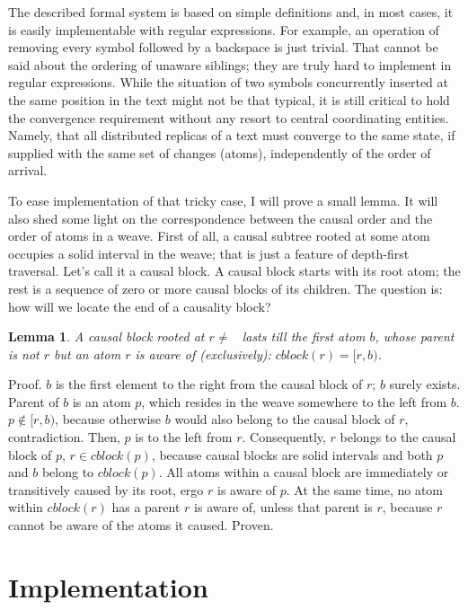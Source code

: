 \documentclass{acm_proc_article-sp}
\newtheorem{lemma}{Lemma}
\begin{document}
The described formal system is based on simple definitions
and, in most cases, it is easily implementable with regular
expressions. For example, an operation of removing every
symbol followed by a backspace is just trivial. That cannot
be said about the ordering of unaware siblings; they are
truly hard to implement in regular expressions. While the
situation of two symbols concurrently inserted at the same position
in the text might not be that typical, it is still critical
to hold the convergence requirement without any resort to
central coordinating entities. Namely, that all distributed
replicas of a text must converge to the same state, if
supplied with the same set of changes (atoms), independently
of the order of arrival.

To ease implementation of that tricky case, I will prove
a small lemma. It will also shed some light on the
correspondence between the causal order and the order of atoms
in a weave.
First of all, a causal subtree rooted at some atom occupies
a solid interval in the weave; that is just a feature of
depth-first traversal. Let's call it a causal block.
A causal block starts with its root atom; the rest is
a sequence of zero or more causal blocks of its children.
The question is: how will we locate the end of a causality
block?
\begin{lemma} A causal block rooted at $r \ne$ \aum ~lasts till
the first atom $b$, whose parent is not $r$ but an atom
$r$ is aware of (exclusively):  $cblock(r) = [r,b)$. 
\end{lemma} \label{lemma:1}
Proof. $b$ is the first element to the right from the causal
block of $r$; $b$ surely exists. Parent of $b$ is an atom $p$,
which resides in the weave somewhere to the left from $b$.
$p \notin [r,b)$, because otherwise $b$ would also belong
to the causal block of $r$, contradiction.
Then, $p$ is to the left from $r$. Consequently, $r$ belongs
to the causal block of $p$, $r \in cblock(p)$, because
causal blocks are solid intervals and both $p$ and $b$
belong to $cblock(p)$. All atoms within a causal block are
immediately or transitively caused by its root,
ergo $r$ is aware of $p$. At the same time, no atom
within $cblock(r)$ has a parent $r$ is aware of, unless
that parent is $r$, because $r$ cannot be aware of the
atoms it caused. Proven.

\section{Implementation}	   \label{sec:algos}
\end{document}
